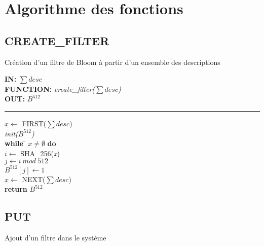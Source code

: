 \chapter{Algorithme des fonctions}
\section{CREATE\_FILTER}
\begin{algorithme}
	Création d'un filtre de Bloom à partir d'un ensemble des descriptions
\end{algorithme}

\begin{flushleft}
	\begin{framed}
		\textbf{IN:} $\sum desc$\\
		\textbf{FUNCTION:} \textit{create\_filter($\sum desc$)}\\
		\textbf{OUT:} \textit{$B^{512}$}\\

		\noindent\rule{\linewidth}{0.5pt}

		\begin{tabbing}
			$x \leftarrow$ FIRST($\sum desc$)\\
			\textit{init($B^{512}$)}\\
			\textbf{while} \= $x \neq \emptyset$ \textbf{do}\\
					\> $i \leftarrow$ SHA\_256(\textit{x})\\
					\> $j \leftarrow i\ mod\ 512$\\
					\> $B^{512}[j]\leftarrow 1$\\
					\> $x \leftarrow$ NEXT($\sum desc$)\\
			\textbf{return} $B^{512}$\\
	    	\end{tabbing}		
	\end{framed}
\end{flushleft}

\section{PUT}
\begin{algorithme}
	Ajout d'un filtre dans le système
\end{algorithme}

